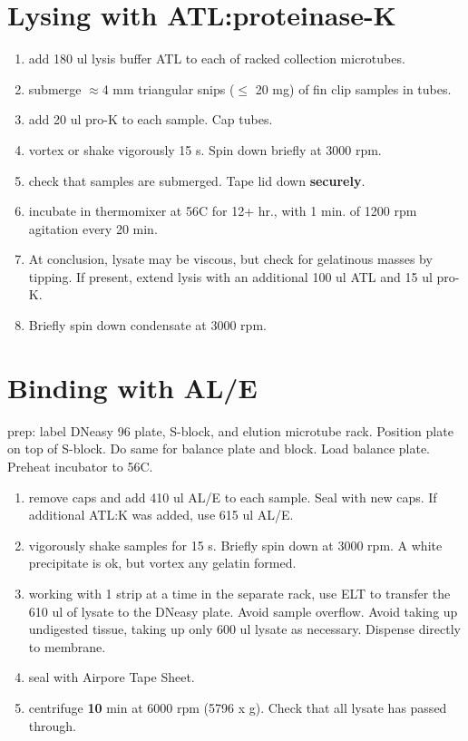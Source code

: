 \documentclass{article}
\begin{document}
\section*{Lysing with ATL:proteinase-K}
\begin{enumerate}
    \item add 180 ul lysis buffer ATL to each of racked collection microtubes.
    \item submerge $\approx$4 mm triangular snips ($\leq$ 20 mg) of fin clip samples in tubes.
    \item add 20 ul pro-K to each sample. Cap tubes.
    \item vortex or shake vigorously 15 s. Spin down briefly at 3000 rpm.
    \item check that samples are submerged. Tape lid down \textbf{securely}.
    \item incubate in thermomixer at 56C for 12+ hr., with 1 min. of 1200 rpm agitation every 20 min.
    \item At conclusion, lysate may be viscous, but check for gelatinous masses by tipping. If present, extend lysis with an additional 100 ul ATL and 15 ul pro-K.
    \item Briefly spin down condensate at 3000 rpm.
\end{enumerate}


\pagebreak

\section*{Binding with AL/E}
prep: label DNeasy 96 plate, S-block, and elution microtube rack. Position plate on top of S-block. Do same for balance plate and block. Load balance plate. Preheat incubator to 56C.

\begin{enumerate}
    \item remove caps and add 410 ul AL/E to each sample. Seal with new caps. If  additional ATL:K was added, use 615 ul AL/E.
    \item vigorously shake samples for 15 s. Briefly spin down at 3000 rpm. A white precipitate is ok, but vortex any gelatin formed.
    \item working with 1 strip at a time in the separate rack, use ELT to transfer the 610 ul of lysate to the DNeasy plate. Avoid sample overflow. Avoid taking up undigested tissue, taking up only 600 ul lysate as necessary. Dispense directly to membrane.
    \item seal with Airpore Tape Sheet.
    \item centrifuge \textbf{10} min at 6000 rpm (5796 x g). Check that all lysate has passed through.
\end{enumerate}
    
\end{document}
